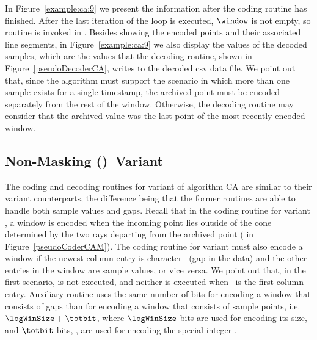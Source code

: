 

\clearpage


In Figure~\ref{example:ca:9} we present the information after the coding routine has finished. After the last iteration of the loop is executed, $\window$ is not empty, so routine \CAWinEnd is invoked in . Besides showing the encoded points and their associated line segments, in Figure~\ref{example:ca:9} we also display the values of the decoded samples, which are the values that the decoding routine, shown in Figure~\ref{pseudoDecoderCA}, writes to the decoded csv data file. We point out that, since the algorithm must support the scenario in which more than one sample exists for a single timestamp, the archived point must be encoded separately from the rest of the window. Otherwise, the decoding routine may consider that the archived value was the last point of the most recently encoded window.






\subsection{Non-Masking (\NOmaskalgo)\ Variant}
\label{algo:ca:nmvariant}


The coding and decoding routines for variant \NOmaskalgo of algorithm CA are similar to their variant \maskalgo counterparts, the difference being that the former routines are able to handle both sample values and gaps. Recall that in the coding routine for variant \maskalgo, a window is encoded when the incoming point lies outside of the cone determined by the two rays departing from the archived point ( in Figure~\ref{pseudoCoderCAM}). The coding routine for variant \NOmaskalgo must also encode a window if the newest column entry is character \noData\ (gap in the data) and the other entries in the window are sample values, or vice versa. We point out that, in the first scenario,  is not executed, and neither is  executed when \noData\ is the first column entry. Auxiliary routine \CAWinEnd uses the same number of bits for encoding a window that consists of gaps than for encoding a window that consists of sample points, i.e. $\logWinSize+\totbit$, where $\logWinSize$ bits are used for encoding its size, and $\totbit$ bits, \wheretotbit, are used for encoding the special integer \nodata. 

